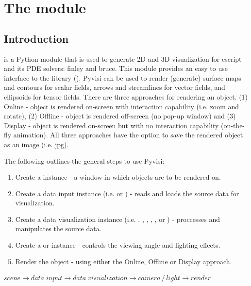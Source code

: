\chapter{The module \pyvisi}
\label{PYVISI CHAP}

\section{Introduction}
\pyvisi is a Python module that is used to generate 2D and 3D visualization 
for escript and its PDE solvers: finley and bruce. This module provides 
an easy to use interface to the \VTK library (\VTKUrl). Pyvisi can be used to 
render (generate) surface maps and contours for scalar fields, arrows and 
streamlines for vector fields, and ellipsoids for tensor fields.  
There are three 
approaches for rendering an object. (1) Online - object is rendered on-screen 
with interaction capability (i.e. zoom and rotate), (2) Offline - object is 
rendered off-screen (no pop-up window) and (3) Display - object is rendered 
on-screen but with no interaction capability (on-the-fly 
animation). All three approaches have the option to save the rendered object 
as an image (i.e. jpg).

The following outlines the general steps to use Pyvisi:

\begin{enumerate}
\item Create a \Scene instance - a window in which objects are to be 
rendered on.
\item Create a data input instance (i.e. \DataCollector or \ImageReader) - 
reads and loads the source data for visualization.
\item Create a data visualization instance (i.e. \Map, \Velocity, \Ellipsoid, 
\Contour, \Carpet, \StreamLine or \Image) -  proccesses and manipulates 
the source data.
\item Create a \Camera or \Light instance - controls the viewing angle and
lighting effects.
\item Render the object - using either the Online, Offline or Display approach.
\end{enumerate}
\begin{center}
\begin{math}
scene \rightarrow data \; input \rightarrow data \; visualization \rightarrow 
camera \, / \, light \rightarrow render
\end{math}
\end{center}

